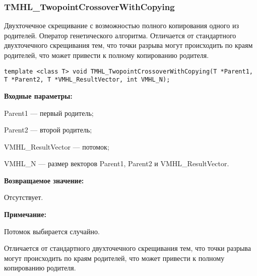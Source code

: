 \documentclass[a4paper,12pt]{article}
\begin{document}
\subsubsection{TMHL\_TwopointCrossoverWithCopying}\label{TMHL_TwopointCrossoverWithCopying}

Двухточечное скрещивание с возможностью полного копирования одного из родителей. Оператор генетического алгоритма. Отличается от стандартного двухточечного скрещивания тем, что точки разрыва могут происходить по краям родителей, что может привести к полному копированию родителя.


\begin{lstlisting}[label=code_syntax_TMHL_TwopointCrossoverWithCopying,caption=Синтаксис]
template <class T> void TMHL_TwopointCrossoverWithCopying(T *Parent1, T *Parent2, T *VMHL_ResultVector, int VMHL_N);
\end{lstlisting}

\textbf{Входные параметры:}
 
 Parent1 --- первый родитель;
 
 Parent2 --- второй родитель;
 
 VMHL\_ResultVector --- потомок;
 
 VMHL\_N --- размер векторов Parent1, Parent2 и VMHL\_ResultVector.

\textbf{Возвращаемое значение:}

 Отсутствует.
 
\textbf{ Примечание:}

 Потомок выбирается случайно.
 
 Отличается от стандартного двухточечного скрещивания тем, что точки разрыва могут происходить по краям родителей, что может привести к полному копированию родителя.
 
\end{document}
